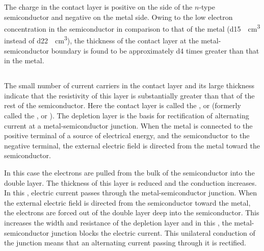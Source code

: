 The charge in the contact layer  is positive on the side of the $n$-type semiconductor and negative on the metal side. Owing to the low electron concentration in the semiconductor in comparison to that of the metal (\SI{d15}{\per\centi\meter\cubed} instead of \SI{d22}{\per\centi\meter\cubed}), the thickness of the contact layer at the metal-semiconductor boundary is found to be approximately \num{d4} times greater than that in the metal.

\subsection{}\label{41.11.6} The small number of current carriers in the contact layer and its large thickness indicate that the resistivity of this layer is substantially greater than that of the rest of the semiconductor. Here the contact layer is called the , or  (formerly called the , or ). The depletion layer is the basis for rectification of alternating current at a metal-semiconductor junction. When the metal is connected to the positive terminal of a source of electrical energy, and the semiconductor to the negative terminal, the external electric field is directed from the metal toward the semiconductor. 


In this case the electrons are pulled from the bulk of the semiconductor into the double layer. The thickness
of this layer is reduced and the conduction increases. In this
, electric current passes through the metal-semiconductor junction. When the external electric field is directed from the semiconductor toward the metal, the electrons are forced out of the double layer deep into the semiconductor. This increases the width and resistance of the depletion layer and in this , the metal-semiconductor junction blocks the electric current. This unilateral conduction of the junction means that an alternating current passing through it is rectified.

